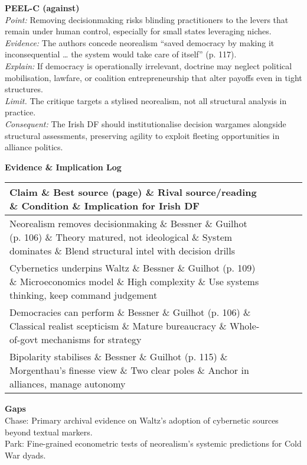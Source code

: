 \textbf{PEEL-C (against)}\\
\textit{Point:} Removing decisionmaking risks blinding practitioners to the levers that remain under human control, especially for small states leveraging niches.\\
\textit{Evidence:} The authors concede neorealism “saved democracy by making it inconsequential … the system would take care of itself” (p. 117).\\
\textit{Explain:} If democracy is operationally irrelevant, doctrine may neglect political mobilisation, lawfare, or coalition entrepreneurship that alter payoffs even in tight structures.\\
\textit{Limit.} The critique targets a stylised neorealism, not all structural analysis in practice.\\
\textit{Consequent:} The Irish DF should institutionalise decision wargames alongside structural assessments, preserving agility to exploit fleeting opportunities in alliance politics.

\textbf{Evidence \& Implication Log}
\begin{tabular}{p{3.2cm}p{4.2cm}p{3.6cm}p{3.2cm}p{4.2cm}}
	\textbf{Claim} \& \textbf{Best source (page)} \& \textbf{Rival source/reading} \& \textbf{Condition} \& \textbf{Implication for Irish DF}\\\hline
	Neorealism removes decisionmaking \& Bessner \& Guilhot (p. 106) \& Theory matured, not ideological \& System dominates \& Blend structural intel with decision drills\\
	Cybernetics underpins Waltz \& Bessner \& Guilhot (p. 109) \& Microeconomics model \& High complexity \& Use systems thinking, keep command judgement\\
	Democracies can perform \& Bessner \& Guilhot (p. 106) \& Classical realist scepticism \& Mature bureaucracy \& Whole-of-govt mechanisms for strategy\\
	Bipolarity stabilises \& Bessner \& Guilhot (p. 115) \& Morgenthau’s finesse view \& Two clear poles \& Anchor in alliances, manage autonomy\\
\end{tabular}

\textbf{Gaps}\\
Chase: Primary archival evidence on Waltz’s adoption of cybernetic sources beyond textual markers.\\
Park: Fine-grained econometric tests of neorealism’s systemic predictions for Cold War dyads.

\parencite{BETTS_1996}

